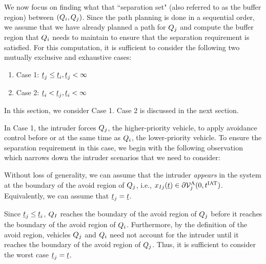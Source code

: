 We now focus on finding what that ``separation set" (also referred to as the buffer region) between $(Q_i, Q_j)$. Since the path planning is done in a sequential order, we assume that we have already planned a path for $Q_j$ and compute the buffer region that $Q_i$ needs to maintain to ensure that the separation requirement is satisfied.
For this computation, it is sufficient to consider the following two mutually exclusive and exhaustive cases: 
\begin{enumerate}
\item Case 1: $\underline{t}_j \leq \underline{t}_i, \underline{t}_j < \infty$
\item Case 2: $\underline{t}_i < \underline{t}_j, \underline{t}_i <\infty$
\end{enumerate}
In this section, we consider Case 1. Case 2 is discussed in the next section.  

In Case 1, the intruder forces $Q_j$, the higher-priority vehicle, to apply avoidance control before or at the same time as $Q_i$, the lower-priority vehicle. %
To ensure the separation requirement in this case, we begin with the following observation which narrows down the intruder scenarios that we need to consider:
\begin{observation} \label{obs1_case1}
Without loss of generality, we can assume that the intruder \textit{appears} in the system at the boundary of the avoid region of $Q_j$, i.e., $x_{I j}(\underline{t}) \in \partial \mathcal{V}^{\text{A}}_{j}(0, t^\text{IAT})$. Equivalently, we can assume that $\underline{t}_j = \underline{t}$.
\end{observation}
Since $\underline{t}_j \leq \underline{t}_i$, $Q_{I}$ reaches the boundary of the avoid region of $Q_j$ before it reaches the boundary of the avoid region of $Q_i$. Furthermore, by the definition of the avoid region, vehicles $Q_j$ and $Q_i$ need not account for the intruder until it reaches the boundary of the avoid region of $Q_j$. Thus, it is sufficient to consider the worst case $\underline{t}_j = \underline{t}$. 